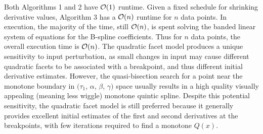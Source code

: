 
Both Algorithms 1 and 2 have ${\cal O}(1)$ runtime. Given a fixed schedule
for shrinking derivative values, Algorithm 3 has a ${\cal O}(n)$ runtime
for $n$ data points. In execution, the majority of the time, still ${\cal
O}(n)$, is spent solving the banded linear system of equations for the
B-spline coefficients.  Thus for $n$ data points, the overall execution
time is ${\cal O}(n)$.  The quadratic facet model produces a unique
sensitivity to input perturbation, as small changes in input may cause
different quadratic facets to be associated with a breakpoint, and thus
different initial derivative estimates.  However, the quasi-bisection
search for a point near the monotone boundary in $(\tau_1$, $\alpha$,
$\beta$, $\gamma)$ space usually results in a high quality visually appealing
(meaning less wiggle) monotone quintic spline.  Despite this potential
sensitivity, the quadratic facet model is still preferred because it
generally provides excellent initial estimates of the first and second
derivatives at the breakpoints, with few iterations required to find a
monotone $Q(x)$.


